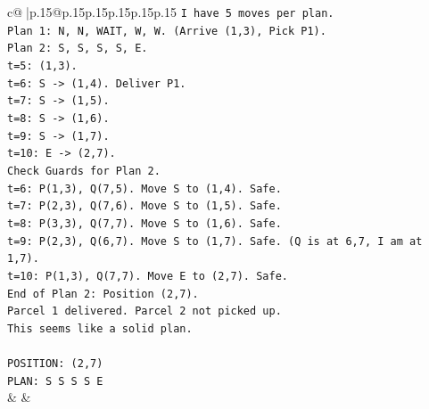 \documentclass{article}
\begin{document}
{\begin{supertabular}{c@{$\;$}|p{.15\linewidth}@{}p{.15\linewidth}p{.15\linewidth}p{.15\linewidth}p{.15\linewidth}p{.15\linewidth}}
{{{\texttt{I have 5 moves per plan.} \\
\texttt{Plan 1: N, N, WAIT, W, W. (Arrive (1,3), Pick P1).} \\
\texttt{Plan 2: S, S, S, S, E.} \\
\texttt{t=5: (1,3).} \\
\texttt{t=6: S {-}> (1,4). Deliver P1.} \\
\texttt{t=7: S {-}> (1,5).} \\
\texttt{t=8: S {-}> (1,6).} \\
\texttt{t=9: S {-}> (1,7).} \\
\texttt{t=10: E {-}> (2,7).} \\
\texttt{Check Guards for Plan 2.} \\
\texttt{t=6: P(1,3), Q(7,5). Move S to (1,4). Safe.} \\
\texttt{t=7: P(2,3), Q(7,6). Move S to (1,5). Safe.} \\
\texttt{t=8: P(3,3), Q(7,7). Move S to (1,6). Safe.} \\
\texttt{t=9: P(2,3), Q(6,7). Move S to (1,7). Safe. (Q is at 6,7, I am at 1,7).} \\
\texttt{t=10: P(1,3), Q(7,7). Move E to (2,7). Safe.} \\
\texttt{End of Plan 2: Position (2,7).} \\
\texttt{Parcel 1 delivered. Parcel 2 not picked up.} \\
\texttt{This seems like a solid plan.} \\
\\ 
\texttt{POSITION: (2,7)} \\
\texttt{PLAN: S S S S E} \\
            }
        }
    }
    & & \\ \\


\end{supertabular}}
\end{document}

